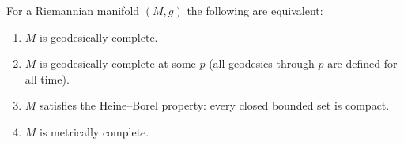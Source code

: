 \begin{theorem}
  \label{thm:pet-ch5-hopf-rinow}
  For a Riemannian manifold $(M,g)$ the following are equivalent:
  \begin{enumerate}
  \item[(1)] $M$ is geodesically complete.
  \item[(2)] $M$ is geodesically complete at some $p$ (all geodesics through $p$
  are defined for all time).
  \item[(3)] $M$ satisfies the Heine–Borel property: every closed bounded set is
  compact.
  \item[(4)] $M$ is metrically complete.
  \end{enumerate}
\end{theorem}
